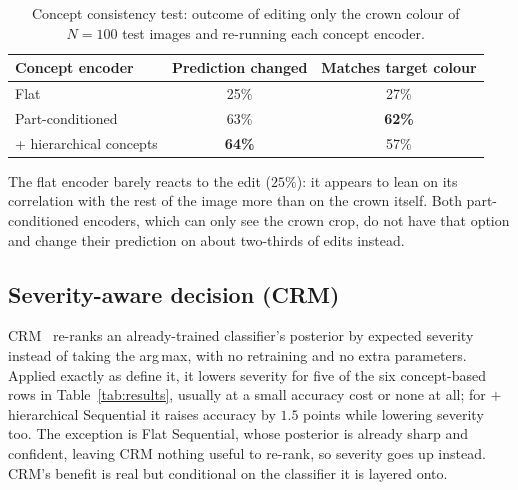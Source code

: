 \begin{table}[b]
  \centering
  \footnotesize
  \caption{Concept consistency test: outcome of editing only the crown
  colour of $N{=}100$ test images and re-running each concept encoder.}
  \label{tab:crown-intervention}
  \begin{tabular}{lcc}
    \toprule
    Concept encoder & Prediction changed & Matches target colour \\
    \midrule
    Flat                       & 25\% & 27\% \\
    Part-conditioned           & 63\% & \textbf{62\%} \\
    \; + hierarchical concepts & \textbf{64\%} & 57\% \\
    \bottomrule
  \end{tabular}
\end{table}

The flat encoder barely reacts to the edit ($25\%$): it appears to lean on
its correlation with the rest of the image more than on the crown itself.
Both part-conditioned encoders, which can only see the crown crop, do not
have that option and change their prediction on about two-thirds of edits
instead.

\subsection{Severity-aware decision (CRM)}
CRM~\cite{karthik2021nocost} re-ranks an already-trained classifier's
posterior by expected severity instead of taking the arg\,max, with no
retraining and no extra parameters. Applied exactly as
\citet{karthik2021nocost} define it, it lowers severity for five of the six
concept-based rows in Table~\ref{tab:results}, usually at a small accuracy
cost or none at all; for $+$hierarchical Sequential it raises accuracy by
$1.5$ points while lowering severity too. The exception is Flat Sequential,
whose posterior is already sharp and confident, leaving CRM nothing useful
to re-rank, so severity goes up instead. CRM's benefit is real but
conditional on the classifier it is layered onto.
